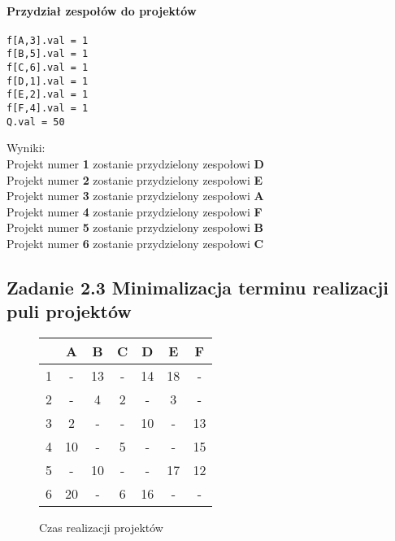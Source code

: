 \documentclass[12pt]{article}
\begin{document}
\paragraph{Przydział zespołów do projektów}
\begin{lstlisting}[caption=wynik z glpk]
f[A,3].val = 1
f[B,5].val = 1
f[C,6].val = 1
f[D,1].val = 1
f[E,2].val = 1
f[F,4].val = 1
Q.val = 50
\end{lstlisting}
Wyniki: \\
Projekt numer \textbf{1} zostanie przydzielony zespołowi \textbf{D} \\
Projekt numer \textbf{2} zostanie przydzielony zespołowi \textbf{E} \\
Projekt numer \textbf{3} zostanie przydzielony zespołowi \textbf{A} \\
Projekt numer \textbf{4} zostanie przydzielony zespołowi \textbf{F} \\
Projekt numer \textbf{5} zostanie przydzielony zespołowi \textbf{B} \\
Projekt numer \textbf{6} zostanie przydzielony zespołowi \textbf{C} \\
\subsection{Zadanie 2.3 Minimalizacja terminu realizacji puli projektów}
\begin{figure}[htb]
\caption{Czas realizacji projektów}
\begin{center}
\begin{tabular}{ | c | c | c | c | c | c | c | }
\hline
  & A & B & C & D & E & F \\ 
 \hline
 1 & - & 13 & - & 14 & 18 & - \\  
 \hline
 2 & - & 4 & 2 & - & 3 & - \\
 \hline  
 3 & 2 & - & - & 10 & - & 13 \\
 \hline  
 4 & 10 & - & 5 & - & - & 15 \\
 \hline  
 5 & - & 10 & - & - & 17 & 12 \\
 \hline  
 6 & 20 & - & 6 & 16 & - & - \\
 \hline
\end{tabular}
\end{center}
\end{figure}
\end{document}
